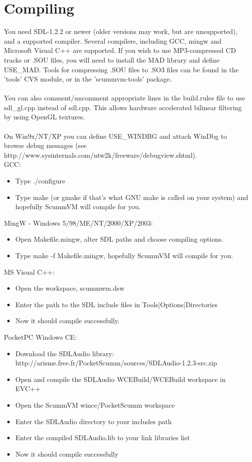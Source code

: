 

\section{Compiling}

You need SDL-1.2.2 or newer (older versions may work, but are unsupported), and
a supported compiler. Several compilers, including GCC, mingw and Microsoft
Visual C++ are supported. If you wish to use MP3-compressed CD tracks or
.SOU files, you will need to install the MAD library and define
USE\_MAD. Tools for compressing .SOU files to .SO3 files can be
found in the 'tools' CVS module, or in the 'scummvm-tools' package.\\
~\\
You can also comment/uncomment appropriate lines in the build.rules file to
use sdl\_gl.cpp instead of sdl.cpp. This allows hardware accelerated bilinear
filtering by using OpenGL textures.\\
~\\
On Win9x/NT/XP you can define USE\_WINDBG and attach WinDbg to browse debug 
messages (see http://www.sysinternals.com/ntw2k/freeware/debugview.shtml).\\
GCC:
  \begin{itemize}
  \item Type ./configure
  \item Type make (or gmake if that's what GNU make is called on your
        system) and hopefully ScummVM will compile for you.
  \end{itemize}
MingW -  Windows 5/98/ME/NT/2000/XP/2003:
  \begin{itemize}
  \item Open Makefile.mingw, alter SDL paths and choose compiling
    options.
  \item Type make -f Makefile.mingw,  hopefully ScummVM will compile for you.
  \end{itemize}
MS Visual C++:
  \begin{itemize}
  \item Open the workspace, scummwm.dsw
  \item Enter the path to the SDL include files in
    Tools|Options|Directories
  \item Now it should compile successfully. 
  \end{itemize}
PocketPC Windows CE:
  \begin{itemize}
  \item Download the SDLAudio library:\\
    http://arisme.free.fr/PocketScumm/sources/SDLAudio-1.2.3-src.zip
  \item Open and compile the SDLAudio WCEBuild/WCEBuild workspace in
    EVC++
  \item Open the ScummVM wince/PocketScumm workspace
  \item Enter the SDLAudio directory to your includes path
  \item Enter the compiled SDLAudio.lib to your link libraries list
  \item Now it should compile successfully
  \end{itemize}
